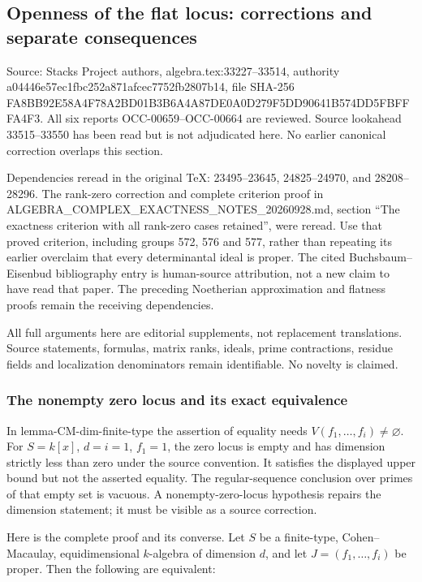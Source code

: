 \subsection{Openness of the flat locus: corrections and separate consequences}\label{openness-of-the-flat-locus-corrections-and-separate-consequences}

Source: Stacks Project authors, algebra.tex:33227--33514, authority a04446e57ec1fbc252a871afcec7752fb2807b14, file SHA-256 FA8BB92E58A4F78A2BD01B3B6A4A87DE0A0D279F5DD90641B574DD5FBFFFA4F3. All six reports OCC-00659--OCC-00664 are reviewed. Source lookahead 33515--33550 has been read but is not adjudicated here. No earlier canonical correction overlaps this section.

Dependencies reread in the original TeX: 23495--23645, 24825--24970, and 28208--28296. The rank-zero correction and complete criterion proof in ALGEBRA\_COMPLEX\_EXACTNESS\_NOTES\_20260928.md, section ``The exactness criterion with all rank-zero cases retained'', were reread. Use that proved criterion, including groups 572, 576 and 577, rather than repeating its earlier overclaim that every determinantal ideal is proper. The cited Buchsbaum--Eisenbud bibliography entry is human-source attribution, not a new claim to have read that paper. The preceding Noetherian approximation and flatness proofs remain the receiving dependencies.

All full arguments here are editorial supplements, not replacement translations. Source statements, formulas, matrix ranks, ideals, prime contractions, residue fields and localization denominators remain identifiable. No novelty is claimed.

\subsubsection{The nonempty zero locus and its exact equivalence}\label{the-nonempty-zero-locus-and-its-exact-equivalence}

In lemma-CM-dim-finite-type the assertion of equality needs \(V(f_1,\ldots,f_i)\ne\varnothing\). For \(S=k[x]\), \(d=i=1\), \(f_1=1\), the zero locus is empty and has dimension strictly less than zero under the source convention. It satisfies the displayed upper bound but not the asserted equality. The regular-sequence conclusion over primes of that empty set is vacuous. A nonempty-zero-locus hypothesis repairs the dimension statement; it must be visible as a source correction.

Here is the complete proof and its converse. Let \(S\) be a finite-type, Cohen--Macaulay, equidimensional \(k\)-algebra of dimension \(d\), and let \(J=(f_1,\ldots,f_i)\) be proper. Then the following are equivalent:

